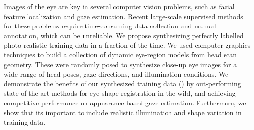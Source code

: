 Images of the eye are key in several computer vision problems, such as facial feature localization and gaze estimation.
Recent large-scale supervised methods for these problems require time-consuming data collection and manual annotation, which can be unreliable.
We propose synthesizing perfectly labelled photo-realistic training data in a fraction of the time.
We used computer graphics techniques to build a collection of dynamic eye-region models from head scan geometry.
These were randomly posed to synthesize close-up eye images for a wide range of head poses, gaze directions, and illumination conditions.
We demonstrate the benefits of our synthesized training data (\dataset) by out-performing state-of-the-art methods for eye-shape registration in the wild, and achieving competitive performance on appearance-based gaze estimation.
Furthermore, we show that its important to include realistic illumination and shape variation in training data.